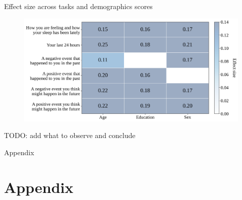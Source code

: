 \documentclass[handout,10pt]{beamer}
\begin{document}
\begin{frame}{Effect size across tasks and demographics scores}

\begin{figure}
    \centering
    \includegraphics[scale=0.35]{img/topic_modeling/heatmap_effect_sizes/V5_V6_V7_V8_V9_V10_diploma_level_gender_age_global_heatmap.png}
    \label{fig:popgen_demo_heatmap}
\end{figure}

TODO: add what to observe and conclude

\end{frame}

\begin{frame}{}
\Large
\begin{center}
    Appendix
    \section{Appendix}
\end{center}

\end{frame}
\end{document}
